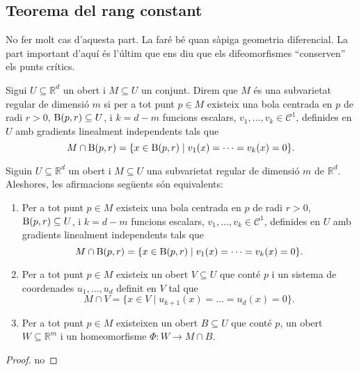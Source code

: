 \documentclass[../Apunts.tex]{subfiles}
\begin{document}
	\subsection{Teorema del rang constant} No fer molt cas d'aquesta part. La faré bé quan sàpiga geometria diferencial. La part important d'aquí és l'últim \corollari{} que ens diu que els difeomorfismes ``conserven'' els punts crítics.
	\begin{definition}
		\label{def:subvarietat regular}
		Sigui \(U\subseteq\mathbb{R}^{d}\) un obert i \(M\subseteq U\) un conjunt. Direm que \(M\) és una subvarietat regular de dimensió \(m\) si per a tot punt \(p\in M\) existeix una bola centrada en \(p\) de radi \(r>0\), \(\operatorname{B}(p,r)\subseteq U\), i \(k=d-m\) funcions escalars, \(v_{1},\dots,v_{k}\in\mathcal{C}^{1}\), definides en \(U\) amb gradients linealment independents tals que
		\[M\cap\operatorname{B}(p,r)=\{x\in\operatorname{B}(p,r)\mid v_{1}(x)=\dots=v_{k}(x)=0\}.\]
	\end{definition}
	\begin{proposition}\label{prop:definicions subvarietat equivalents}
		Siguin \(U\subseteq\mathbb{R}^{d}\) un obert i \(M\subseteq U\) una subvarietat regular de dimensió \(m\) de \(\mathbb{R}^{d}\). Aleshores, les afirmacions següents són equivalents:
		\begin{enumerate}
			\item Per a tot punt \(p\in M\) existeix una bola centrada en \(p\) de radi \(r>0\), \(\operatorname{B}(p,r)\subseteq U\), i \(k=d-m\) funcions escalars, \(v_{1},\dots,v_{k}\in\mathcal{C}^{1}\), definides en \(U\) amb gradients linealment independents tals que
			\[M\cap\operatorname{B}(p,r)=\{x\in\operatorname{B}(p,r)\mid v_{1}(x)=\dots=v_{k}(x)=0\}.\]
			\item Per a tot punt \(p\in M\) existeix un obert \(V\subseteq U\) que conté \(p\) i un sistema de coordenades \(u_{1},\dots,u_{d}\) definit en \(V\) tal que
			\[M\cap V=\{x\in V\mid u_{k+1}(x)=\dots=u_{d}(x)=0\}.\]
			\item Per a tot punt \(p\in M\) existeixen un obert \(B\subseteq U\) que conté \(p\), un obert \(W\subseteq\mathbb{R}^{m}\) i un homeomorfisme \(\Phi\colon W\to M\cap B\).
		\end{enumerate}
		\begin{proof}
			no %
		\end{proof}
	\end{proposition}
\end{document}

